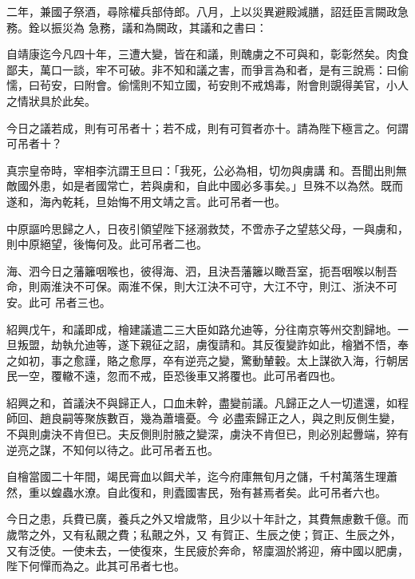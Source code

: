\begin{pinyinscope}
 二年，兼國子祭酒，尋除權兵部侍郎。八月，上以災異避殿減膳，詔廷臣言闕政急務。銓以振災為
 急務，議和為闕政，其議和之書曰：



 自靖康迄今凡四十年，三遭大變，皆在和議，則醜虜之不可與和，彰彰然矣。肉食鄙夫，萬口一談，牢不可破。非不知和議之害，而爭言為和者，是有三說焉：曰偷懦，曰茍安，曰附會。偷懦則不知立國，茍安則不戒鴆毒，附會則覬得美官，小人之情狀具於此矣。



 今日之議若成，則有可吊者十；若不成，則有可賀者亦十。請為陛下極言之。何謂可吊者十？



 真宗皇帝時，宰相李沆謂王旦曰：「我死，公必為相，切勿與虜講
 和。吾聞出則無敵國外患，如是者國常亡，若與虜和，自此中國必多事矣。」旦殊不以為然。既而遂和，海內乾耗，旦始悔不用文靖之言。此可吊者一也。



 中原謳吟思歸之人，日夜引領望陛下拯溺救焚，不啻赤子之望慈父母，一與虜和，則中原絕望，後悔何及。此可吊者二也。



 海、泗今日之藩籬咽喉也，彼得海、泗，且決吾藩籬以瞰吾室，扼吾咽喉以制吾命，則兩淮決不可保。兩淮不保，則大江決不可守，大江不守，則江、浙決不可安。此可
 吊者三也。



 紹興戊午，和議即成，檜建議遣二三大臣如路允迪等，分往南京等州交割歸地。一旦叛盟，劫執允迪等，遂下親征之詔，虜復請和。其反復變詐如此，檜猶不悟，奉之如初，事之愈謹，賂之愈厚，卒有逆亮之變，驚動輦轂。太上謀欲入海，行朝居民一空，覆轍不遠，忽而不戒，臣恐後車又將覆也。此可吊者四也。



 紹興之和，首議決不與歸正人，口血未幹，盡變前議。凡歸正之人一切遣還，如程師回、趙良嗣等聚族數百，幾為蕭墻憂。今
 必盡索歸正之人，與之則反側生變，不與則虜決不肯但已。夫反側則肘腋之變深，虜決不肯但已，則必別起釁端，猝有逆亮之謀，不知何以待之。此可吊者五也。



 自檜當國二十年間，竭民膏血以餌犬羊，迄今府庫無旬月之儲，千村萬落生理蕭然，重以蝗蟲水潦。自此復和，則蠹國害民，殆有甚焉者矣。此可吊者六也。



 今日之患，兵費已廣，養兵之外又增歲幣，且少以十年計之，其費無慮數千億。而歲幣之外，又有私覿之費；私覿之外，又
 有賀正、生辰之使；賀正、生辰之外，又有泛使。一使未去，一使復來，生民疲於奔命，帑廩涸於將迎，瘠中國以肥虜，陛下何憚而為之。此其可吊者七也。




\end{pinyinscope}
